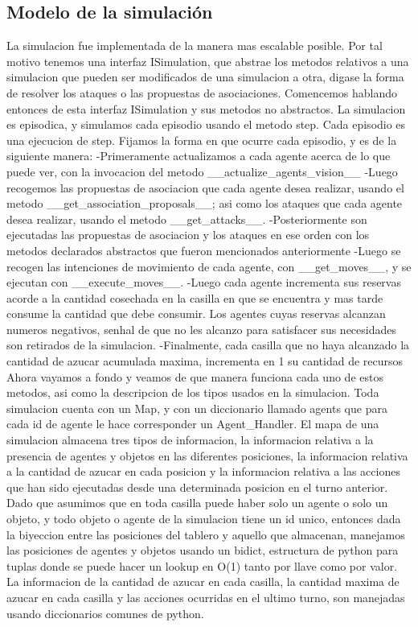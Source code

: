 \documentclass[11pt]{article}
\begin{document}
\subsection{Modelo de la simulación}
La simulacion fue implementada de la manera mas escalable posible. Por tal motivo tenemos una interfaz ISimulation, que abstrae los metodos relativos a una simulacion que pueden ser modificados de una simulacion a otra, digase la forma de resolver los ataques o las propuestas de asociaciones. Comencemos hablando entonces de esta interfaz ISimulation y sus metodos no abstractos.
La simulacion es episodica, y simulamos cada episodio usando el metodo step. Cada episodio es una ejecucion de step. Fijamos la forma en que ocurre cada episodio, y es de la siguiente manera:
-Primeramente actualizamos a cada agente acerca de lo que puede ver, con la invocacion del metodo __actualize_agents_vision__
-Luego recogemos las propuestas de asociacion que cada agente desea realizar, usando el metodo __get_association_proposals__; asi como los ataques que cada agente desea realizar, usando el metodo __get_attacks__.
-Posteriormente son ejecutadas las propuestas de asociacion y los ataques en ese orden con los metodos declarados abstractos que fueron mencionados anteriormente
-Luego se recogen las intenciones de movimiento de cada agente, con __get_moves__, y se ejecutan con __execute_moves__.
-Luego cada agente incrementa sus reservas acorde a la cantidad cosechada en la casilla en que se encuentra y mas tarde consume la cantidad que debe consumir. Los agentes cuyas reservas alcanzan numeros negativos, senhal de que no les alcanzo para satisfacer sus necesidades son retirados de la simulacion.
-Finalmente, cada casilla que no haya alcanzado la cantidad de azucar acumulada maxima, incrementa en 1 su cantidad de recursos
Ahora vayamos a fondo y veamos de que manera funciona cada uno de estos metodos, asi como la descripcion de los tipos usados en la simulacion.
Toda simulacion cuenta con un Map, y con un diccionario llamado agents que para cada id de agente le hace corresponder un Agent_Handler.
El mapa de una simulacion almacena tres tipos de informacion, la informacion relativa a la presencia de agentes y objetos en las diferentes posiciones, la informacion relativa a la cantidad de azucar en cada posicion y la informacion relativa a las acciones que han sido ejecutadas desde una determinada posicion en el turno anterior. Dado que asumimos que en toda casilla puede haber solo un agente o solo un objeto, y todo objeto o agente de la simulacion tiene un id unico, entonces dada la biyeccion entre las posiciones del tablero y aquello que almacenan, manejamos las posiciones de agentes y objetos usando un bidict, estructura de python para tuplas donde se puede hacer un lookup en O(1) tanto por llave como por valor. La informacion de la cantidad de azucar en cada casilla, la cantidad maxima de azucar en cada casilla y las acciones ocurridas en el ultimo turno, son manejadas usando diccionarios comunes de python.
\end{document}
